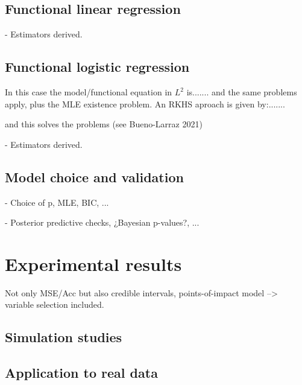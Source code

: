 \documentclass[ba]{imsart}
\numberwithin{equation}{section}
\theoremstyle{plain}
\newenvironment{comment}
{
\noindent \em \color{red}
}
{
\color{black}
}
\begin{document}
\subsection{Functional linear regression}

\begin{comment}
  - Estimators derived.
\end{comment}

\subsection{Functional logistic regression}

In this case the model/functional equation in $L^2$ is....... and the same problems apply, plus the MLE existence problem. An RKHS aproach is given by:.......

 and this solves the problems (see Bueno-Larraz 2021)

\begin{comment}
  - Estimators derived.
\end{comment}

\subsection{Model choice and validation}

\begin{comment}
  - Choice of p, MLE, BIC, ...

  - Posterior predictive checks, ¿Bayesian p-values?, ...
\end{comment}



\section{Experimental results}

\begin{comment}
  Not only MSE/Acc but also credible intervals, points-of-impact model --> variable selection included.
\end{comment}

\subsection{Simulation studies}

\subsection{Application to real data}
\end{document}
